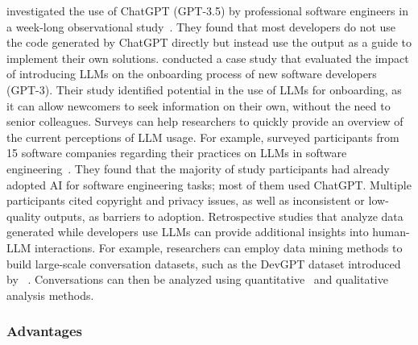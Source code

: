\citeauthor{DBLP:journals/pacmse/KhojahM0N24} investigated the use of ChatGPT (GPT-3.5) by professional software engineers in a week-long observational study~\cite{DBLP:journals/pacmse/KhojahM0N24}.
They found that most developers do not use the code generated by ChatGPT directly but instead use the output as a guide to implement their own solutions.
\citeauthor{DBLP:conf/csee/AzanzaPIG24} conducted a case study that evaluated the impact of introducing LLMs on the onboarding process of new software developers~\cite{DBLP:conf/csee/AzanzaPIG24} (GPT-3).
Their study identified potential in the use of LLMs for onboarding, as it can allow newcomers to seek information on their own, without the need to  senior colleagues.
Surveys can help researchers to quickly provide an overview of the current perceptions of LLM usage.
For example, \citeauthor{DBLP:conf/icsa/JahicS24} surveyed participants from 15 software companies regarding their practices on LLMs in software engineering~\cite{DBLP:conf/icsa/JahicS24}.
They found that the majority of study participants had already adopted AI for software engineering tasks; most of them used ChatGPT.
Multiple participants cited copyright and privacy issues, as well as inconsistent or low-quality outputs, as barriers to adoption.
Retrospective studies that analyze data generated while developers use LLMs can provide additional insights into human-LLM interactions.
For example, researchers can employ data mining methods to build large-scale conversation datasets, such as the DevGPT dataset introduced by \citeauthor{DBLP:conf/msr/XiaoTHM24}~\cite{DBLP:conf/msr/XiaoTHM24}.
Conversations can then be analyzed using quantitative~\cite{DBLP:conf/msr/RabbiCZI24} and qualitative~\cite{DBLP:conf/msr/MohamedPP24} analysis methods.

\subsubsection{Advantages}

